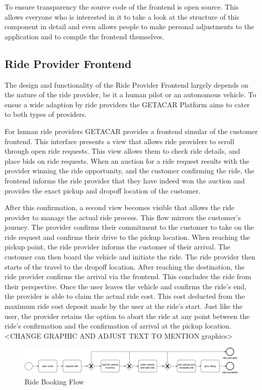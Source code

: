 To ensure transparency the source code of the frontend is open source. This allows everyone who is interested in it to take a look at the structure of this component in detail and even allows people to make personal adjustments to the application and to compile the frontend themselves.

\subsection{Ride Provider Frontend}
The design and functionality of the Ride Provider Frontend largely depends on the nature of the ride provider, be it a human pilot or an autonomous vehicle. To ensue a wide adaption by ride providers the GETACAR Platform aims to cater to both types of providers.

For human ride providers GETACAR provides a frontend simular of the customer frontend. This interface presents a view that allows ride providers to scroll through open ride requests. This view allows them to check ride details, and place bids on ride requests. When an auction for a ride request results with the provider winning the ride opportunity, and the customer confirming the ride, the frontend informs the ride provider that they have indeed won the auction and provides the exact pickup and dropoff location of the customer.

After this confirmation, a second view becomes visible that allows the ride provider to manage the actual ride process. This flow mirrors the customer's journey. The provider confirms their commitment to the customer to take on the ride request and confirms their drive to the pickup location. When reaching the pickup point, the ride provider informs the customer of their arrival. The customer can then board the vehicle and initiate the ride. The ride provider then starts of the travel to the dropoff location. After reaching the destination, the ride provider confirms the arrival via the frontend. This  concludes the ride from their perspective. Once the user leaves the vehicle and confirms the ride's end, the provider is able to claim the actual ride cost. This cost deducted from the maximum ride cost deposit made by the user at the ride's start. 
Just like the user, the provider retains the option to abort the ride at any point between the ride's confirmation and the confirmation of arrival at the pickup location.
<CHANGE GRAPHIC AND ADJUST TEXT TO MENTION graphics>

\begin{figure}[h]
    \centering
    \includegraphics[width=\linewidth]{data/3.svg}
    \caption{Ride Booking Flow}
    \label{fig:directSVG}
\end{figure}

